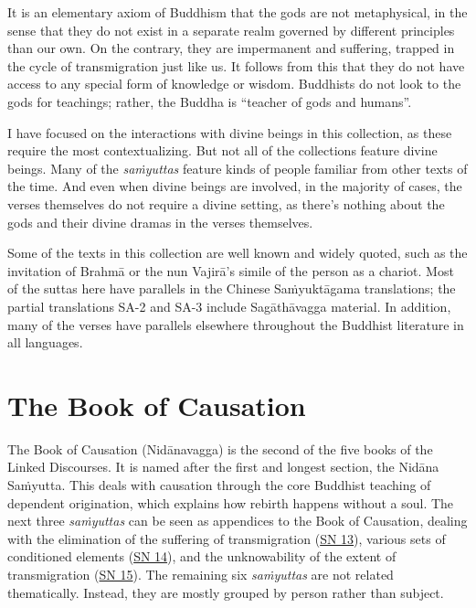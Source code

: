 \documentclass[12pt,openany]{book}%
\begin{document}
It is an elementary axiom of Buddhism that the gods are not metaphysical, in the sense that they do not exist in a separate realm governed by different principles than our own. On the contrary, they are impermanent and suffering, trapped in the cycle of transmigration just like us. It follows from this that they do not have access to any special form of knowledge or wisdom. Buddhists do not look to the gods for teachings; rather, the Buddha is “teacher of gods and humans”.

I have focused on the interactions with divine beings in this collection, as these require the most contextualizing. But not all of the collections feature divine beings. Many of the \textit{\textsanskrit{saṁyuttas}} feature kinds of people familiar from other texts of the time. And even when divine beings are involved, in the majority of cases, the verses themselves do not require a divine setting, as there’s nothing about the gods and their divine dramas in the verses themselves.

Some of the texts in this collection are well known and widely quoted, such as the invitation of \textsanskrit{Brahmā} or the nun \textsanskrit{Vajirā}’s simile of the person as a chariot. Most of the suttas here have parallels in the Chinese \textsanskrit{Saṁyuktāgama} translations; the partial translations SA-2 and SA-3 include \textsanskrit{Sagāthāvagga} material. In addition, many of the verses have parallels elsewhere throughout the Buddhist literature in all languages.

\section*{The Book of Causation}

The Book of Causation (\textsanskrit{Nidānavagga}) is the second of the five books of the Linked Discourses. It is named after the first and longest section, the \textsanskrit{Nidāna} \textsanskrit{Saṁyutta}. This deals with causation through the core Buddhist teaching of dependent origination, which explains how rebirth happens without a soul. The next three \textit{\textsanskrit{saṁyuttas}} can be seen as appendices to the Book of Causation, dealing with the elimination of the suffering of transmigration (\href{https://suttacentral.net/sn13}{SN 13}), various sets of conditioned elements (\href{https://suttacentral.net/sn14}{SN 14}), and the unknowability of the extent of transmigration (\href{https://suttacentral.net/sn15}{SN 15}). The remaining six \textit{\textsanskrit{saṁyuttas}} are not related thematically. Instead, they are mostly grouped by person rather than subject.
\end{document}
